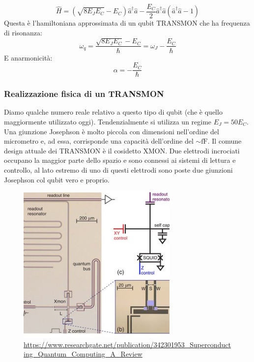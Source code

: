 \begin{equation*}
     \hat H = \left(\sqrt{8 E_J E_C} - E_C \right) \hat a^\dagger \hat a - \frac{E_C}{2} \hat a^\dagger \hat a (\hat a^\dagger \hat a - 1)
\end{equation*}
Questa è l'hamiltoniana approssimata di un qubit TRANSMON che ha frequenza di risonanza:
\begin{equation*}
    \omega_q = \frac{\sqrt{8E_J E_C} - E_C}{\hbar} = \omega_J - \frac{E_C}{\hbar}
\end{equation*}
E anarmonicità:
\begin{equation*}
    \alpha = -\frac{E_C}{\hbar}
\end{equation*}
\subsubsection{Realizzazione fisica di un TRANSMON}
Diamo qualche numero reale relativo a questo tipo di qubit (che è quello maggiormente utilizzato oggi).
Tendenzialmente si utilizza un regime $E_J = 50E_C$. 
Una giunzione Josephson è molto piccola con dimensioni nell'ordine del micrometro e, ad essa, corrisponde una capacità dell'ordine del $\sim \text{fF}$. Il comune design attuale dei TRANSMON è il cosidetto XMON. Due elettrodi incrociati occupano la maggior parte dello spazio e sono connessi ai sistemi di lettura e controllo, al lato estremo di uno di questi elettrodi sono poste due giunzioni Josephson col qubit vero e proprio.
\begin{figure}[!htp]
    \centering
    \includegraphics[width=0.7\textwidth]{images/xmon_qubit.jpg}
    \caption{\url{https://www.researchgate.net/publication/342301953_Superconducting_Quantum_Computing_A_Review}}
\end{figure}

